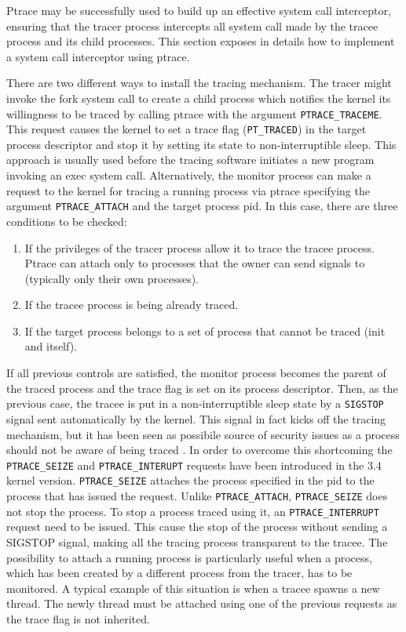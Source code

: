 Ptrace may be successfully used to build up an effective system call interceptor, ensuring that the tracer process intercepts all system call made by the tracee process and its child processes. This section exposes in details how to implement a system call interceptor using ptrace. 

There are two different ways to install the tracing mechanism. The tracer might invoke the fork system call to create a child process which notifies the kernel its willingness to be traced by calling ptrace with the argument \lstinline$PTRACE_TRACEME$. This request causes the kernel to set a trace flag (\lstinline$PT_TRACED$) in the target process descriptor and stop it by setting its state to non-interruptible sleep. This approach is usually used before the tracing software initiates a new program invoking an exec system call. Alternatively, the monitor process can make a request to the kernel for tracing a running process via ptrace specifying the argument \lstinline$PTRACE_ATTACH$ and the target process pid. In this case, there are three conditions to be checked:
\begin{enumerate}
\item If the privileges of the tracer process allow it to trace the tracee process. Ptrace can attach only to processes that the owner can send signals to (typically only their own processes).
\item If the tracee process is being already traced.
\item If the target process belongs to a set of process that cannot be traced (init and itself).
\end{enumerate}

If all previous controls are satisfied, the monitor process becomes the parent of the traced process and the trace flag is set on its process descriptor. Then, as the previous case, the tracee is put in a non-interruptible sleep state by a \lstinline$SIGSTOP$ signal sent automatically by the kernel. This signal in fact kicks off the tracing mechanism, but it has been seen as possibile source of security issues as a process should not be aware of being traced \cite{ptrace_seize}. In order to overcome this shortcoming the \lstinline$PTRACE_SEIZE$ and \lstinline$PTRACE_INTERUPT$ requests have been introduced in the 3.4 kernel version. \lstinline$PTRACE_SEIZE$ attaches the process specified in the pid to the process that has issued the request. Unlike \lstinline$PTRACE_ATTACH$, \lstinline$PTRACE_SEIZE$ does not stop the process. To stop a process traced using it, an \lstinline$PTRACE_INTERRUPT$ request need to be issued. This cause the stop of the process without sending a SIGSTOP signal, making all the tracing process transparent to the tracee. 
The possibility to attach a running process is particularly useful when a process, which has been created by a different process from the tracer, has to be monitored. A typical example of this situation is when a tracee spawns a new thread. The newly thread must be attached using one of the previous requests as the trace flag is not inherited.  

